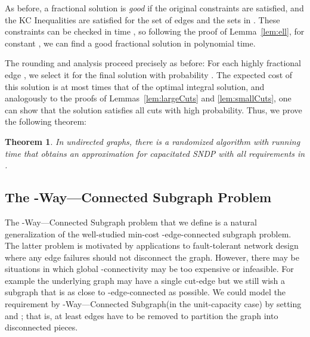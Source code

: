 \documentclass[11pt]{article}
\newcounter{thm0Rcopies}
\newcounter{thm_saved}
\newtheorem{theorem}[lemma]{Theorem}
\def\kway{-Way---Connected Subgraph\xspace}
\begin{document}
As before, a fractional solution  is \emph{good} if the original
constraints are satisfied, and the KC Inequalities are satisfied for
the set of edges  and the sets in . These constraints can be
checked in time , so following the proof
of Lemma~\ref{lem:ell}, for constant , we can find a good
fractional solution in polynomial time.

The rounding and analysis proceed precisely as before: For each highly
fractional edge , we select it for the final solution with
probability . The expected cost of this
solution is at most  times that of the optimal
integral solution, and analogously to the proofs of
Lemmas~\ref{lem:largeCuts} and \ref{lem:smallCuts}, one can show that
the solution satisfies all cuts with high probability. Thus, we prove
the following theorem:

\begin{theorem}\label{thm:nearlyUniform}
  In undirected graphs, there is a randomized algorithm with running
  time  that obtains an 
  approximation for capacitated SNDP with all requirements in .
\end{theorem}
\fi

\subsection{The \kway Problem}
\label{subsec:kway}
\iffalse
An -way cut  of a graph  is a partition of its vertices
into  sets ; we use  to denote the
set of edges with endpoints in different sets of the partition .
The \emph{capacity} of an -way cut  is the total capacity of
edges in . 

In the \kway problem, the input is a graph , with a cost
 and integer capacity  for each edge , along with
 integer requirements , such that . The goal is to find a minimum-cost
subgraph  of  such that for each , the capacity
of any -way cut of  is at least . It is easy to see that
Cap-SNDP with uniform requirements is the special case of \kway with
. Our techniques of this section can be naturally extended to
prove the following generalization of Theorem~\ref{thm:uniform}.

\begin{theorem}\label{thm:kWay}
  There is a randomized algorithm with running time  that
  obtains an -approximation for the \kway problem.
\end{theorem}
\fi

The \kway problem that we define is a natural generalization of the
well-studied min-cost -edge-connected subgraph problem. The latter
problem is motivated by applications to fault-tolerant network design
where any  edge failures should not disconnect the graph.
However, there may be situations in which global -connectivity may
be too expensive or infeasible. For example the underlying graph 
may have a single cut-edge but we still wish a subgraph that is as
close to -edge-connected as possible. We could model the
requirement by \kway (in the unit-capacity case) by setting 
and ; that is, at least  edges have to be removed to 
partition the graph into  disconnected pieces.
\end{document}
